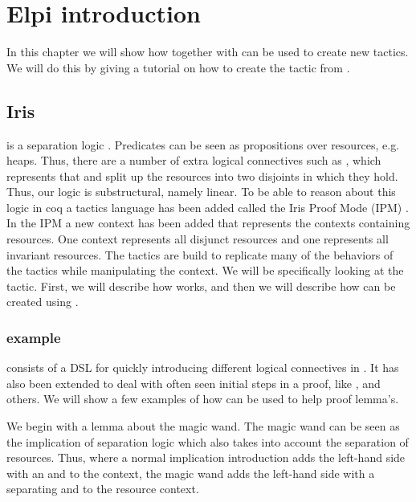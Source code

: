 \documentclass[thesis.tex]{subfiles}
\begin{document}
\chapter{Elpi introduction}
In this chapter we will show how \elpi together with \ce can be used to create new tactics. We will do this by giving a tutorial on how to create the  tactic from \iris.

\section[Iris iIntros]{Iris }
\iris is a separation logic \cite*{jungIrisMonoidsInvariants2015a,jungHigherorderGhostState2016,krebbersEssenceHigherOrderConcurrent2017,jungIrisGroundModular2018}. Predicates can be seen as propositions over resources, e.g. heaps. Thus, there are a number of extra logical connectives such as , which represents that  and  split up the resources into two disjoints in which they hold. Thus, our logic is substructural, namely linear. To be able to reason about this logic in coq a tactics language has been added called the Iris Proof Mode (IPM) \cite*{krebbersInteractiveProofsHigherorder2017,krebbersMoSeLGeneralExtensible2018}. In the IPM a new context has been added that represents the contexts containing resources. One context represents all disjunct resources and one represents all invariant resources. The tactics are build to replicate many of the behaviors of the \coq tactics while manipulating the \iris context. We will be specifically looking at the  tactic. First, we will describe how  works, and then we will describe how  can be created using \elpi.

\subsection[iIntros example]{ example}
 consists of a DSL for quickly introducing different logical connectives in \iris. It has also been extended to deal with often seen initial steps in a proof, like ,  and others. We will show a few examples of how  can be used to help proof lemma's.

We begin with a lemma about the magic wand. The magic wand can be seen as the implication of separation logic which also takes into account the separation of resources. Thus, where a normal implication introduction adds the left-hand side with an and to the context, the magic wand adds the left-hand side with a separating and to the resource context.
\end{document}

